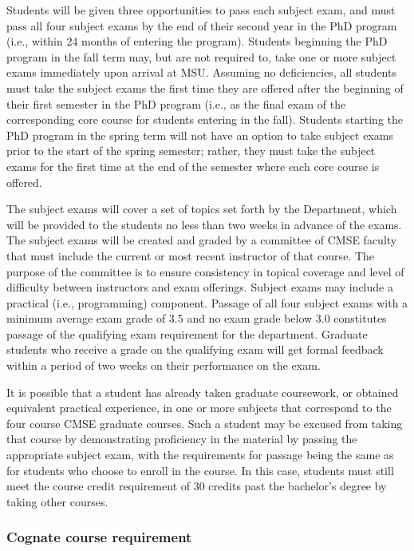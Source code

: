 Students will be given three opportunities to pass each subject exam,
and must pass all four subject exams by the end of their second year
in the PhD program (i.e., within 24 months of entering the program).
Students beginning the PhD program in the fall
term may, but are not required to, take one or more subject exams
immediately upon arrival at MSU.  Assuming no deficiencies, all
students must take the subject exams the first time they are offered
after the beginning of their first semester in the PhD program (i.e.,
as the final exam of the corresponding core course for students
entering in the fall).  Students starting the PhD program in the
spring term will not have an option to take subject exams prior to the
start of the spring semester; rather, they must take the subject exams
for the first time at the end of the semester where each core course
is offered.

The subject exams will cover a set of topics set forth by the
Department, which will be provided to the students no less than two weeks in advance of the
exams. The subject exams will be created and graded by a committee of
CMSE faculty that must include the current or most recent instructor
of that course.  The purpose of the committee is to ensure consistency
in topical coverage and level of difficulty between instructors and
exam offerings.  Subject exams may include a practical (i.e.,
programming) component.  Passage of all four subject exams with a
minimum average exam grade of 3.5 and no exam grade below 3.0
constitutes passage of the qualifying exam requirement for the
department.  Graduate students who receive a grade on the qualifying
exam will get formal feedback within a period of  two weeks on
their performance on the exam.


It is possible that a student has already taken graduate coursework,
or obtained equivalent practical experience, in one or more subjects
that correspond to the four course CMSE graduate courses.  Such a
student may be excused from taking that course by demonstrating
proficiency in the material by passing the appropriate subject exam,
with the requirements for passage being the same as for students who
choose to enroll in the course.  In this case, students must still
meet the course credit requirement of 30 credits past the bachelor's
degree by taking other courses.

\vspace{3mm}
\subsubsection{Cognate course requirement}
\label{sec:cognate_course}


